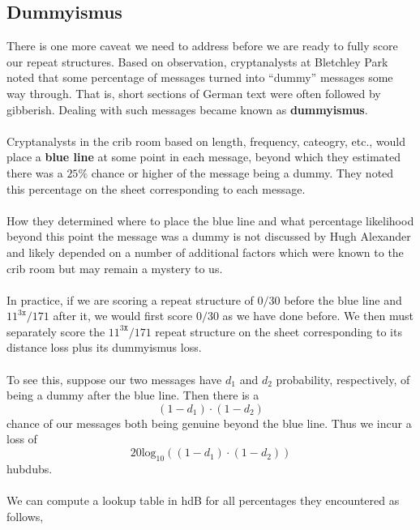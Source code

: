   \subsection{Dummyismus}
  There is one more caveat we need to address before we are ready to
  fully score our repeat structures. Based on observation,
  cryptanalysts at Bletchley Park noted that some percentage of
  messages turned into ``dummy'' messages some way through. That is,
  short sections of German text were often followed by gibberish. Dealing with
  such messages became known as {\bf{dummyismus}}.
  \\\\Cryptanalysts in the crib room  based on length, frequency,
  cateogry, etc., would place a {\bf{blue line}} at some point in
  each message, beyond which they estimated there was a $25\%$ chance
  or higher of the message being a dummy. They noted this
  percentage on the sheet corresponding to each message.
  \\\\How they determined where to place the blue line and what
  percentage likelihood beyond this point the message was a dummy is
  not discussed by Hugh Alexander and likely depended on a number of
  additional factors which were known to the crib room but may remain
  a mystery to us.
  \\\\In practice, if we are scoring a repeat structure of $0/30$
  before the blue line and $11^{3\texttt{x}}/171$ after it, we would
  first score $0/30$ as we have done before. We then must separately score the
  $11^{3\texttt{X}}/171$ repeat structure on the sheet corresponding to its distance
  loss plus its dummyismus loss.
  \\\\To see this, suppose our two messages have $d_1$ and $d_2$
  probability, respectively, of being a dummy after the blue line. Then there is a
  \[
    (1-d_1)\cdot(1-d_2)
  \]
  chance of our messages both being genuine beyond the blue line. Thus we incur a loss of 
  \[
    20\text{log}_{10}((1-d_1)\cdot(1-d_2))
  \]
  hubdubs. 
  \\\\We can compute a lookup table in hdB for all percentages they
  encountered as follows,
